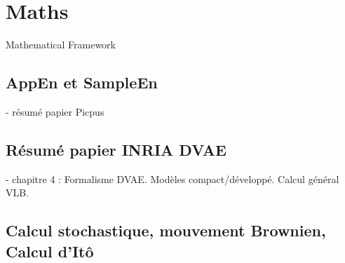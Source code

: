 \section{Maths}\label{Maths}
    
Mathematical Framework

\subsection{AppEn et SampleEn}

- résumé papier Picpus

\subsection{Résumé papier INRIA DVAE}

- chapitre 4 : Formalisme DVAE. Modèles compact/développé. Calcul général VLB. 

\subsection{Calcul stochastique, mouvement Brownien, Calcul d'Itô}